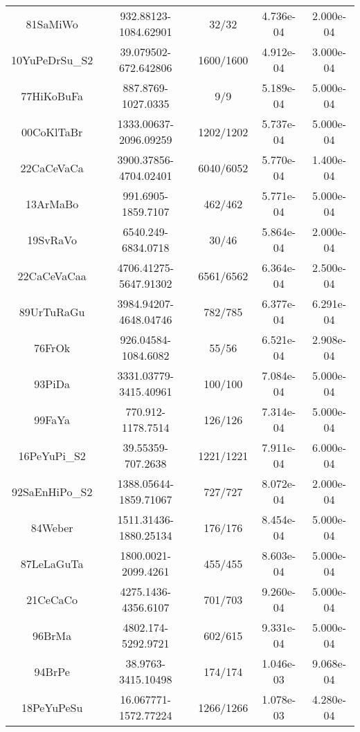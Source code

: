 \begin{longtable}{c c c c c}
81SaMiWo \cite{81SaMiWo.NH3} & 932.88123-1084.62901 & 32/32 & 4.736e-04 & 2.000e-04 \\
10YuPeDrSu_S2 \cite{10YuPeDrSu_S2.NH3} & 39.079502-672.642806 & 1600/1600 & 4.912e-04 & 3.000e-04 \\
77HiKoBuFa \cite{77HiKoBuFa.NH3} & 887.8769-1027.0335 & 9/9 & 5.189e-04 & 5.000e-04 \\
00CoKlTaBr \cite{00CoKlTaBr.NH3} & 1333.00637-2096.09259 & 1202/1202 & 5.737e-04 & 5.000e-04 \\
22CaCeVaCa \cite{22CaCeVaCa.NH3} & 3900.37856-4704.02401 & 6040/6052 & 5.770e-04 & 1.400e-04 \\
13ArMaBo \cite{13ArMaBo.NH3} & 991.6905-1859.7107 & 462/462 & 5.771e-04 & 5.000e-04 \\
19SvRaVo \cite{19SvRaVo.NH3} & 6540.249-6834.0718 & 30/46 & 5.864e-04 & 2.000e-04 \\
22CaCeVaCaa \cite{22CaCeVaCaa.NH3} & 4706.41275-5647.91302 & 6561/6562 & 6.364e-04 & 2.500e-04 \\
89UrTuRaGu \cite{89UrTuRaGu.NH3} & 3984.94207-4648.04746 & 782/785 & 6.377e-04 & 6.291e-04 \\
76FrOk \cite{76FrOk.NH3} & 926.04584-1084.6082 & 55/56 & 6.521e-04 & 2.908e-04 \\
93PiDa \cite{93PiDa.NH3} & 3331.03779-3415.40961 & 100/100 & 7.084e-04 & 5.000e-04 \\
99FaYa \cite{99FaYa.NH3} & 770.912-1178.7514 & 126/126 & 7.314e-04 & 5.000e-04 \\
16PeYuPi_S2 \cite{16PeYuPi_S2.NH3} & 39.55359-707.2638 & 1221/1221 & 7.911e-04 & 6.000e-04 \\
92SaEnHiPo_S2 \cite{92SaEnHiPo_S2.NH3} & 1388.05644-1859.71067 & 727/727 & 8.072e-04 & 2.000e-04 \\
84Weber \cite{84Weber.NH3} & 1511.31436-1880.25134 & 176/176 & 8.454e-04 & 5.000e-04 \\
87LeLaGuTa \cite{87LeLaGuTa.NH3} & 1800.0021-2099.4261 & 455/455 & 8.603e-04 & 5.000e-04 \\
21CeCaCo \cite{21CeCaCo.NH3} & 4275.1436-4356.6107 & 701/703 & 9.260e-04 & 5.000e-04 \\
96BrMa \cite{96BrMa.NH3} & 4802.174-5292.9721 & 602/615 & 9.331e-04 & 5.000e-04 \\
94BrPe \cite{94BrPe.NH3} & 38.9763-3415.10498 & 174/174 & 1.046e-03 & 9.068e-04 \\
18PeYuPeSu \cite{18PeYuPeSu.NH3} & 16.067771-1572.77224 & 1266/1266 & 1.078e-03 & 4.280e-04 \\

\end{longtable}
